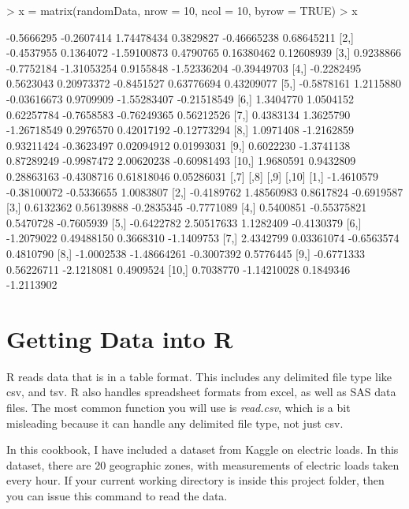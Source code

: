 \documentclass{article}
\begin{document}
\begin{Schunk}
\begin{Sinput}
> x = matrix(randomData, nrow = 10, ncol = 10, byrow = TRUE)
> x
\end{Sinput}
\begin{Soutput}
            [,1]       [,2]        [,3]       [,4]        [,5]        [,6]
 [1,] -0.5666295 -0.2607414  1.74478434  0.3829827 -0.46665238  0.68645211
 [2,] -0.4537955  0.1364072 -1.59100873  0.4790765  0.16380462  0.12608939
 [3,]  0.9238866 -0.7752184 -1.31053254  0.9155848 -1.52336204 -0.39449703
 [4,] -0.2282495  0.5623043  0.20973372 -0.8451527  0.63776694  0.43209077
 [5,] -0.5878161  1.2115880 -0.03616673  0.9709909 -1.55283407 -0.21518549
 [6,]  1.3404770  1.0504152  0.62257784 -0.7658583 -0.76249365  0.56212526
 [7,]  0.4383134  1.3625790 -1.26718549  0.2976570  0.42017192 -0.12773294
 [8,]  1.0971408 -1.2162859  0.93211424 -0.3623497  0.02094912  0.01993031
 [9,]  0.6022230 -1.3741138  0.87289249 -0.9987472  2.00620238 -0.60981493
[10,]  1.9680591  0.9432809  0.28863163 -0.4308716  0.61818046  0.05286031
            [,7]        [,8]       [,9]      [,10]
 [1,] -1.4610579 -0.38100072 -0.5336655  1.0083807
 [2,] -0.4189762  1.48560983  0.8617824 -0.6919587
 [3,]  0.6132362  0.56139888 -0.2835345 -0.7771089
 [4,]  0.5400851 -0.55375821  0.5470728 -0.7605939
 [5,] -0.6422782  2.50517633  1.1282409 -0.4130379
 [6,] -1.2079022  0.49488150  0.3668310 -1.1409753
 [7,]  2.4342799  0.03361074 -0.6563574  0.4810790
 [8,] -1.0002538 -1.48664261 -0.3007392  0.5776445
 [9,] -0.6771333  0.56226711 -2.1218081  0.4909524
[10,]  0.7038770 -1.14210028  0.1849346 -1.2113902
\end{Soutput}
\end{Schunk}

\section{Getting Data into R}

R reads data that is in a table format.  This includes any delimited file type like
csv, and tsv.  R also handles spreadsheet formats from excel, as well as SAS data files.
The most common function you will use is \textit{read.csv}, which is a bit misleading
because it can handle any delimited file type, not just csv.

In this cookbook, I have included a dataset from Kaggle on electric loads.  In
this dataset, there are 20 geographic zones, with measurements of electric loads
taken every hour.  If your current working directory is inside this project folder,
then you can issue this command to read the data.
\end{document}
